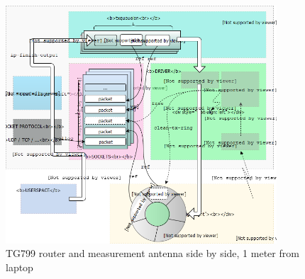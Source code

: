 \begin{figure}
\center
\includegraphics[width=0.9\textwidth]{images/linux-egress-overview.png}
\caption{TG799 router and measurement antenna side by side, 1 meter from laptop}
\label{fig:linux_egress}
\end{figure}